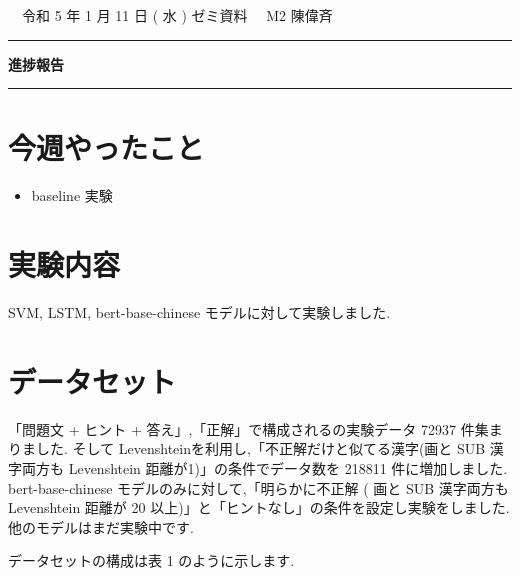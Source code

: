 \documentclass[draftclsnofoot,onecolumn]{jarticle}
\begin{document}
\onecolumn
\noindent

\hspace{1em}

\ \ 令和 5 年 1 月 11 日 ( 水 ) ゼミ資料 
\hfill
\ \ M2 陳偉斉


\vspace{2mm}

\hrule

\begin{center}
{\Large \bf 進捗報告}
\end{center}


\hrule
\vspace{3mm}

\section{今週やったこと}
	\begin{itemize}
	  \item baseline 実験\vspace{-0.5em}
	\end{itemize}

\section{実験内容}
SVM, LSTM, bert-base-chinese モデルに対して実験しました.

\section{データセット}
「問題文 + ヒント + 答え」,「正解」で構成されるの実験データ 72937 件集まりました.
そして Levenshteinを利用し,「不正解だけと似てる漢字(画と SUB 漢字両方も Levenshtein 距離が1)」の条件でデータ数を 218811 件に増加しました.
bert-base-chinese モデルのみに対して,「明らかに不正解 ( 画と SUB 漢字両方も Levenshtein 距離が 20 以上)」と「ヒントなし」の条件を設定し実験をしました.他のモデルはまだ実験中です.

データセットの構成は表 1 のように示します.

\begin{table}[h]
\centering
\caption{データセットの構成}
\label{a}
\centering
{}
\end{table}
\end{document}
